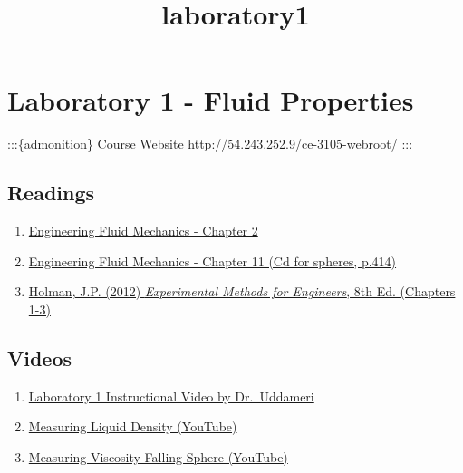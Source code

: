 \documentclass[11pt]{article}
\title{laboratory1}
\providecommand{\tightlist}{%
      \setlength{\itemsep}{0pt}\setlength{\parskip}{0pt}}
\begin{document}
    
    \maketitle
    
    

    
    \hypertarget{laboratory-1---fluid-properties}{%
\section{Laboratory 1 - Fluid
Properties}\label{laboratory-1---fluid-properties}}

:::\{admonition\} Course Website
\url{http://54.243.252.9/ce-3105-webroot/} :::

    \hypertarget{readings}{%
\subsection{Readings}\label{readings}}

\begin{enumerate}
\def\labelenumi{\arabic{enumi}.}
\tightlist
\item
  \href{http://54.243.252.9/ce-3105-webroot/2-Exercises/laboratory1/EFM-2.pdf}{Engineering
  Fluid Mechanics - Chapter 2}
\item
  \href{http://54.243.252.9/ce-3105-webroot/2-Exercises/laboratory1/EFM-22.pdf}{Engineering
  Fluid Mechanics - Chapter 11 (Cd for spheres, p.414)}
\item
  \href{https://mech.at.ua/HolmanICS.pdf}{Holman, J.P. (2012)
  \emph{Experimental Methods for Engineers}, 8th Ed. (Chapters 1-3)}
\end{enumerate}

    \hypertarget{videos}{%
\subsection{Videos}\label{videos}}

\begin{enumerate}
\def\labelenumi{\arabic{enumi}.}
\tightlist
\item
  \href{https://www.youtube.com/watch?v=WwV-azCJWis}{Laboratory 1
  Instructional Video by Dr.~Uddameri}
\item
  \href{https://www.youtube.com/watch?v=NJhxwlVKong}{Measuring Liquid
  Density (YouTube)}
\item
  \href{https://www.youtube.com/shorts/DsYuumidARg}{Measuring Viscosity
  Falling Sphere (YouTube)}
\end{enumerate}
\end{document}
